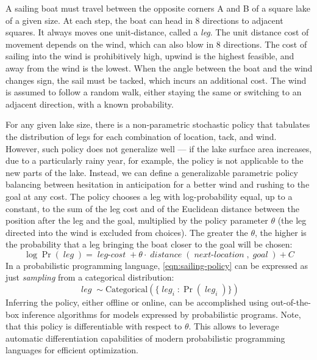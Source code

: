 \documentclass[letterpaper]{article} %
\newcommand{\var}[1]{{\operatorname{\mathit{#1}}}}
\theoremstyle{definition}
\begin{document}
A sailing boat must travel
between the opposite corners A and B of a square lake of a
given size. At each step, the boat can head in 8
directions to adjacent squares. It always moves one unit-distance, called a {\em leg}. The
unit distance cost of movement depends on the wind, which can
also blow in 8 directions.
The cost of sailing into the wind is prohibitively high, upwind
is the highest feasible, and away from the wind is the lowest.
When the angle between the boat and the wind changes sign, the
sail must be tacked, which incurs an additional cost. 
The wind is assumed to follow a random walk, either
staying the same or switching to an adjacent
direction, with a known probability.

For any given lake size, there is a non-parametric stochastic policy
that tabulates the distribution of legs for each
combination of location, tack, and wind.
However, such policy does not
generalize well --- if the lake surface area increases, due to a
particularly rainy year, for example, the policy is not
applicable to the new parts of the lake. Instead, we
can define a generalizable parametric policy balancing between
hesitation in anticipation for a better wind and rushing to the
goal at any cost.  The policy chooses a leg with log-probability
equal, up to a constant, to the sum of the leg cost and of the Euclidean
distance between the position after the leg and the goal,
multiplied by the policy parameter $\theta$ (the leg directed
into the wind is excluded
from choices). The greater the $\theta$, the higher is the
probability that a leg bringing the boat closer to the goal will
be chosen:
\begin{equation}
    \log \Pr(\var{leg}) = \var{leg-cost} + \theta \cdot\var{distance}(\var{next-location}, \var{goal}) + C
	\label{eqn:sailing-policy}
\end{equation}
In a probabilistic programming language,
\eqref{eqn:sailing-policy} can be expressed as
just \textit{sampling} from a categorical distribution:
\begin{equation}
    \var{leg} \sim \mathrm{Categorical}(\{\var{leg}_i: \Pr(\var{leg}_i)\})
\end{equation}
Inferring the policy, either offline or online, can be
accomplished using out-of-the-box inference algorithms for
models expressed by probabilistic programs. Note, that this
policy is differentiable with respect to $\theta$. This allows
to leverage automatic differentiation capabilities of modern
probabilistic programming languages for efficient optimization.
\end{document}
